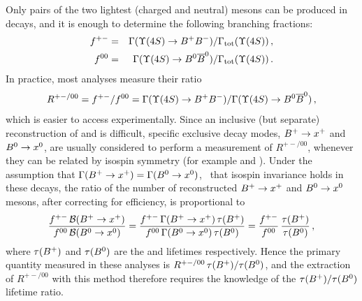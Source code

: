 Only pairs of the two lightest (charged and neutral) \B mesons 
can be produced in \Ups decays, 
and it is enough to determine the following branching 
fractions:
\begin{eqnarray}
f^{+-} & = & \Gamma(\Ups \to \particle{B^+B^-})/
             \Gamma_{\rm tot}(\Ups)  \,, \\
f^{00} & = & \Gamma(\Ups \to \particle{B^0\bar{B}^0})/
             \Gamma_{\rm tot}(\Ups) \,.
\end{eqnarray}
In practice, most analyses measure their ratio
\begin{equation}
R^{+-/00} = f^{+-}/f^{00} = \Gamma(\Ups \to \particle{B^+B^-})/
             \Gamma(\Ups \to \particle{B^0\bar{B}^0}) \,,
\end{equation}
which is easier to access experimentally.
Since an inclusive (but separate) reconstruction of 
\Bu and \Bd is difficult, specific exclusive decay modes, 
${B^+} \to x^+$ and ${B^0} \to x^0$, are usually considered to perform 
a measurement of $R^{+-/00}$, whenever they can be related by 
isospin symmetry (for example  and 
).
Under the assumption that $\Gamma(B^+ \to x^+) = \Gamma(B^0 \to x^0)$, 
\ie\ that isospin invariance holds in these \B decays,
the ratio of the number of reconstructed
$B^+ \to x^+$ and $B^0 \to x^0$ mesons, after correcting for efficiency, is
proportional to
\begin{equation}
\frac{f^{+-}\, \BR{\Bu\to x^+}}{f^{00}\, \BR{\Bd\to x^0}}
= \frac{f^{+-}\, \Gamma({\Bu}\to x^+)\, \tau(\Bu)}%
{f^{00}\, \Gamma({\Bd}\to x^0)\,\tau(\Bd)}
= \frac{f^{+-}}{f^{00}} \, \frac{\tau(\Bu)}{\tau(\Bd)}  \,, 
\end{equation} 
where $\tau(B^+)$ and $\tau(B^0)$ are the \Bu and \Bd 
lifetimes respectively.
Hence the primary quantity measured in these analyses 
is $R^{+-/00} \, \tau(B^+)/\tau(B^0)$, 
and the extraction of $R^{+-/00}$ with this method therefore 
requires the knowledge of the $\tau(B^+)/\tau(B^0)$ lifetime ratio. 

